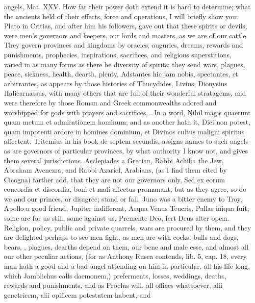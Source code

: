 {angels, Mat. XXV.
How far their power doth extend it is hard to determine; what the
ancients held of their effects, force and operations, I will briefly
show you: Plato in Critias, and after him his followers, gave out that
these spirits or devils, were men's governors and keepers, our lords
and masters, as we are of our cattle. They govern provinces and
kingdoms by oracles, auguries, dreams, rewards and punishments,
prophecies, inspirations, sacrifices, and religious superstitions,
varied in as many forms as there be diversity of spirits; they send
wars, plagues, peace, sickness, health, dearth, plenty, Adstantes
hic jam nobis, spectantes, et arbitrantes, \etc{} as appears by those
histories of Thucydides, Livius, Dionysius Halicarnassus, with many
others that are full of their wonderful stratagems, and were therefore
by those Roman and Greek commonwealths adored and worshipped for gods
with prayers and sacrifices, \etc{}. In a word, Nihil magis quaerunt
quam metum et admirationem hominum; and as another hath it, Dici
non potest, quam impotenti ardore in homines dominium, et Divinos
cultus maligni spiritus affectent. Tritemius in his book de
septem secundis, assigns names to such angels as are governors of
particular provinces, by what authority I know not, and gives them
several jurisdictions. Asclepiades a Grecian, Rabbi Achiba the Jew,
Abraham Avenezra, and Rabbi Azariel, Arabians, (as I find them cited by
Cicogna) farther add, that they are not our governors only, Sed
ex eorum concordia et discordia, boni et mali affectus promanant, but
as they agree, so do we and our princes, or disagree; stand or fall.
Juno was a bitter enemy to Troy, Apollo a good friend, Jupiter
indifferent, Aequa Venus Teucris, Pallas iniqua fuit; some are for us
still, some against us, Premente Deo, fert Deus alter opem. Religion,
policy, public and private quarrels, wars are procured by them, and
they are delighted perhaps to see men fight, as men are with
cocks, bulls and dogs, bears, \etc{}, plagues, dearths depend on them, our
bene and male esse, and almost all our other peculiar actions, (for as
Anthony Rusea contends, lib. 5, cap. 18, every man hath a good and a
bad angel attending on him in particular, all his life long, which
Jamblichus calls daemonem,) preferments, losses, weddings, deaths,
rewards and punishments, and as Proclus will, all offices
whatsoever, alii genetricem, alii opificem potestatem habent, \etc{} and
}

